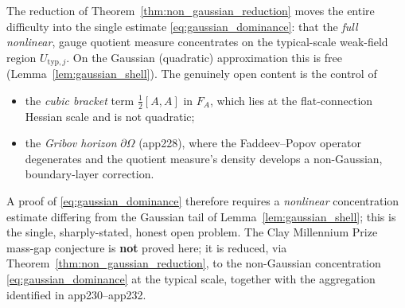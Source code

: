 \begin{remark}
\label{rem:open_non_gaussian}
The reduction of Theorem~\ref{thm:non_gaussian_reduction} moves the
entire difficulty into the single estimate
\eqref{eq:gaussian_dominance}: that the \emph{full nonlinear}, gauge
quotient measure concentrates on the typical-scale weak-field region
$U_{\mathrm{typ},j}$. On the Gaussian (quadratic) approximation this is
free (Lemma~\ref{lem:gaussian_shell}). The genuinely open content is the
control of
\begin{itemize}
\item the \emph{cubic bracket} term $\tfrac12[A,A]$ in $F_A$, which
lies at the flat-connection Hessian scale and is not quadratic;
\item the \emph{Gribov horizon} $\partial\Omega$ (app228), where the
Faddeev--Popov operator degenerates and the quotient measure's density
develops a non-Gaussian, boundary-layer correction.
\end{itemize}
A proof of \eqref{eq:gaussian_dominance} therefore requires a
\emph{nonlinear} concentration estimate differing from the Gaussian tail
of Lemma~\ref{lem:gaussian_shell}; this is the single, sharply-stated,
honest open problem. The Clay Millennium Prize mass-gap conjecture is
\textbf{not} proved here; it is reduced, via
Theorem~\ref{thm:non_gaussian_reduction}, to the non-Gaussian
concentration \eqref{eq:gaussian_dominance} at the typical scale,
together with the aggregation identified in app230--app232.
\end{remark}

\endinput
